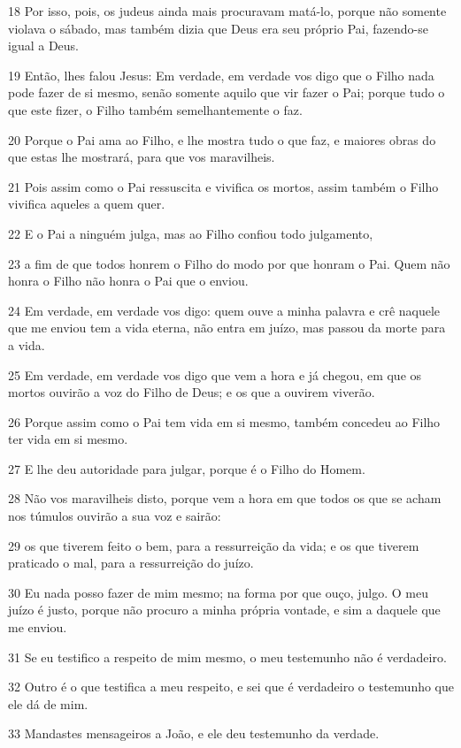 \par 18 Por isso, pois, os judeus ainda mais procuravam matá-lo, porque não somente violava o sábado, mas também dizia que Deus era seu próprio Pai, fazendo-se igual a Deus.
\par 19 Então, lhes falou Jesus: Em verdade, em verdade vos digo que o Filho nada pode fazer de si mesmo, senão somente aquilo que vir fazer o Pai; porque tudo o que este fizer, o Filho também semelhantemente o faz.
\par 20 Porque o Pai ama ao Filho, e lhe mostra tudo o que faz, e maiores obras do que estas lhe mostrará, para que vos maravilheis.
\par 21 Pois assim como o Pai ressuscita e vivifica os mortos, assim também o Filho vivifica aqueles a quem quer.
\par 22 E o Pai a ninguém julga, mas ao Filho confiou todo julgamento,
\par 23 a fim de que todos honrem o Filho do modo por que honram o Pai. Quem não honra o Filho não honra o Pai que o enviou.
\par 24 Em verdade, em verdade vos digo: quem ouve a minha palavra e crê naquele que me enviou tem a vida eterna, não entra em juízo, mas passou da morte para a vida.
\par 25 Em verdade, em verdade vos digo que vem a hora e já chegou, em que os mortos ouvirão a voz do Filho de Deus; e os que a ouvirem viverão.
\par 26 Porque assim como o Pai tem vida em si mesmo, também concedeu ao Filho ter vida em si mesmo.
\par 27 E lhe deu autoridade para julgar, porque é o Filho do Homem.
\par 28 Não vos maravilheis disto, porque vem a hora em que todos os que se acham nos túmulos ouvirão a sua voz e sairão:
\par 29 os que tiverem feito o bem, para a ressurreição da vida; e os que tiverem praticado o mal, para a ressurreição do juízo.
\par 30 Eu nada posso fazer de mim mesmo; na forma por que ouço, julgo. O meu juízo é justo, porque não procuro a minha própria vontade, e sim a daquele que me enviou.
\par 31 Se eu testifico a respeito de mim mesmo, o meu testemunho não é verdadeiro.
\par 32 Outro é o que testifica a meu respeito, e sei que é verdadeiro o testemunho que ele dá de mim.
\par 33 Mandastes mensageiros a João, e ele deu testemunho da verdade.
